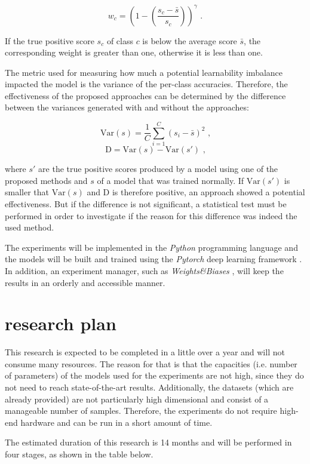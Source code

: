 \documentclass[journal]{IEEEtran}
\begin{document}
\[ w_c = \left(1-\left(\frac{s_c - \bar{s}}{s_c}\right)\right)^\gamma \text{ .} \]

If the true positive score $s_c$ of class $c$ is below the average score $\bar{s}$, the corresponding weight is greater than one, otherwise it is less than one.

The metric used for measuring how much a potential learnability imbalance impacted the model is the variance of the per-class accuracies.
Therefore, the effectiveness of the proposed approaches can be determined by the difference between the variances generated with and without the approaches:

\[ \text{Var}(s) = \frac{1}{C} \sum_{i=1}^{C} (s_i - \bar{s})^2 \text{ ,} \]
\[ \text{D} = \text{Var}(s) - \text{Var}(s') \text{ ,} \]

where $s'$ are the true positive scores produced by a model using one of the proposed methods and $s$ of a model that was trained normally. 
If $\text{Var}(s')$ is smaller that $\text{Var}(s)$ and D is therefore positive, an approach showed a potential effectiveness.
But if the difference is not significant, a statistical test must be performed in order to investigate if the reason for this difference was indeed the used method.

The experiments will be implemented in the \emph{Python} programming language and the models will be built and trained using the \emph{Pytorch} deep learning framework \cite{paszke2019pytorch}.
In addition, an experiment manager, such as \emph{Weights\&Biases} \cite{WandB}, will keep the results in an orderly and accessible manner.

\section{research plan}
This research is expected to be completed in a little over a year and will not consume many resources.
The reason for that is that the capacities (i.e. number of parameters) of the models used for the experiments are not high, since they do not need to reach state-of-the-art results.
Additionally, the datasets (which are already provided) are not particularly high dimensional and consist of a manageable number of samples.
Therefore, the experiments do not require high-end hardware and can be run in a short amount of time.

The estimated duration of this research is 14 months and will be performed in four stages, as shown in the table below.
\end{document}
